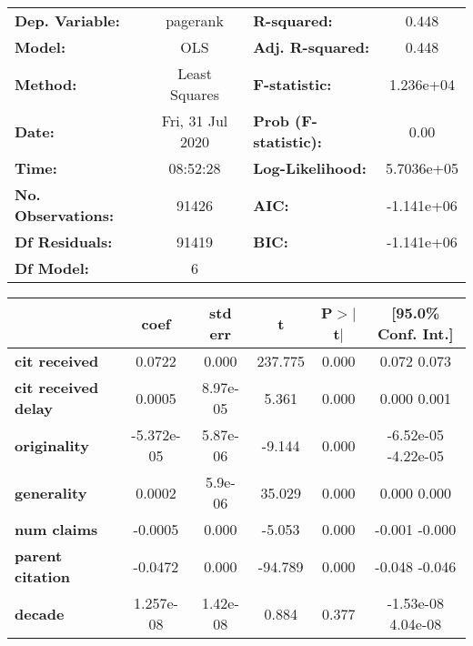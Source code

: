 \begin{center}
\begin{tabular}{lclc}
\toprule
\textbf{Dep. Variable:}     &     pagerank     & \textbf{  R-squared:         } &      0.448    \\
\textbf{Model:}             &       OLS        & \textbf{  Adj. R-squared:    } &      0.448    \\
\textbf{Method:}            &  Least Squares   & \textbf{  F-statistic:       } &  1.236e+04    \\
\textbf{Date:}              & Fri, 31 Jul 2020 & \textbf{  Prob (F-statistic):} &      0.00     \\
\textbf{Time:}              &     08:52:28     & \textbf{  Log-Likelihood:    } &  5.7036e+05   \\
\textbf{No. Observations:}  &       91426      & \textbf{  AIC:               } &  -1.141e+06   \\
\textbf{Df Residuals:}      &       91419      & \textbf{  BIC:               } &  -1.141e+06   \\
\textbf{Df Model:}          &           6      & \textbf{                     } &               \\
\bottomrule
\end{tabular}
\begin{tabular}{lccccc}
                            & \textbf{coef} & \textbf{std err} & \textbf{t} & \textbf{P$>$$|$t$|$} & \textbf{[95.0\% Conf. Int.]}  \\
\midrule
\textbf{cit received}       &       0.0722  &        0.000     &   237.775  &         0.000        &         0.072     0.073       \\
\textbf{cit received delay} &       0.0005  &     8.97e-05     &     5.361  &         0.000        &         0.000     0.001       \\
\textbf{originality}        &   -5.372e-05  &     5.87e-06     &    -9.144  &         0.000        &     -6.52e-05 -4.22e-05       \\
\textbf{generality}         &       0.0002  &      5.9e-06     &    35.029  &         0.000        &         0.000     0.000       \\
\textbf{num claims}         &      -0.0005  &        0.000     &    -5.053  &         0.000        &        -0.001    -0.000       \\
\textbf{parent citation}    &      -0.0472  &        0.000     &   -94.789  &         0.000        &        -0.048    -0.046       \\
\textbf{decade}             &    1.257e-08  &     1.42e-08     &     0.884  &         0.377        &     -1.53e-08  4.04e-08       \\

\end{tabular}
\end{center}
